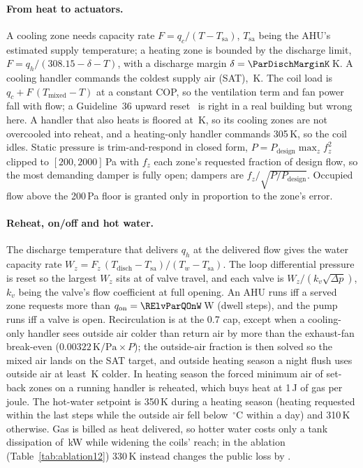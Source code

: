 \paragraph{From heat to actuators.} A cooling zone needs capacity rate $F = q_c/(T - T_{\text{sa}})$, $T_{\text{sa}}$ being the AHU's estimated supply temperature; a heating zone is bounded by the discharge limit, $F = q_h/(308.15 - \delta - T)$, with a discharge margin $\delta = \ParDischMarginK$\,K. A cooling handler commands the coldest supply air (SAT), \ParSatCoolHi\,K. The coil load is $q_c + F\,(T_{\text{mixed}} - T)$ at a constant COP, so the ventilation term and fan power fall with flow; a Guideline~36 upward reset~\citep{ashrae2021g36,taylor2018vav} is right in a real building but wrong here. A handler that also heats is floored at \ParSatMixFloor\,K, so its cooling zones are not overcooled into reheat, and a heating-only handler commands 305\,K, so the coil idles. Static pressure is trim-and-respond in closed form, $P = P_{\text{design}}\max_z f_z^2$ clipped to $[200, 2000]$\,Pa with $f_z$ each zone's requested fraction of design flow, so the most demanding damper is fully open; dampers are $f_z/\sqrt{P/P_{\text{design}}}$. Occupied flow above the 200\,Pa floor is granted only in proportion to the zone's error.

\paragraph{Reheat, on/off and hot water.} The discharge temperature that delivers $q_h$ at the delivered flow gives the water capacity rate $W_z = F_z\,(T_{\text{disch}} - T_{\text{sa}})/(T_w - T_{\text{sa}})$. The loop differential pressure is reset so the largest $W_z$ sits at \ParValveTarget{} of valve travel, and each valve is $W_z/(k_v \sqrt{\Delta p})$, $k_v$ being the valve's flow coefficient at full opening. An AHU runs iff a served zone requests more than $q_{\text{on}} = \RElvParQOnW$\,W (dwell \ParMinOnSteps{} steps), and the pump runs iff a valve is open. Recirculation is at the 0.7 cap, except when a cooling-only handler sees outside air colder than return air by more than the exhaust-fan break-even ($0.00322\,\text{K/Pa}\times P$); the outside-air fraction is then solved so the mixed air lands on the SAT target, and outside heating season a night flush uses outside air at least \ParRFFlushDt\,K colder. In heating season the forced minimum air of set-back zones on a running handler is reheated, which buys heat at 1\,J of gas per joule. The hot-water setpoint is 350\,K during a heating season (heating requested within the last \RTenSeasonSteps{} steps while the outside air fell below \RTenSeasonOatC\,$^\circ$C within a day) and 310\,K otherwise. Gas is billed as heat delivered, so hotter water costs only a tank dissipation of \TankLossExtraKw\,kW while widening the coils' reach; in the ablation (Table~\ref{tab:ablation12}) 330\,K instead changes the public loss by \RElvAbTwRel.

